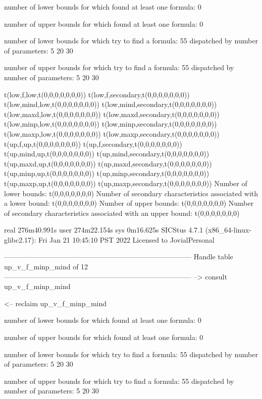 number of lower bounds for which found at least one formula: 0

number of upper bounds for which found at least one formula: 0

number of lower bounds for which try to find a formula: 55
dispatched by number of parameters: 5  20  30

number of upper bounds for which try to find a formula: 55
dispatched by number of parameters: 5  20  30

t(low,f,low,t(0,0,0,0,0,0,0))
t(low,f,secondary,t(0,0,0,0,0,0,0))
t(low,mind,low,t(0,0,0,0,0,0,0))
t(low,mind,secondary,t(0,0,0,0,0,0,0))
t(low,maxd,low,t(0,0,0,0,0,0,0))
t(low,maxd,secondary,t(0,0,0,0,0,0,0))
t(low,minp,low,t(0,0,0,0,0,0,0))
t(low,minp,secondary,t(0,0,0,0,0,0,0))
t(low,maxp,low,t(0,0,0,0,0,0,0))
t(low,maxp,secondary,t(0,0,0,0,0,0,0))
t(up,f,up,t(0,0,0,0,0,0,0))
t(up,f,secondary,t(0,0,0,0,0,0,0))
t(up,mind,up,t(0,0,0,0,0,0,0))
t(up,mind,secondary,t(0,0,0,0,0,0,0))
t(up,maxd,up,t(0,0,0,0,0,0,0))
t(up,maxd,secondary,t(0,0,0,0,0,0,0))
t(up,minp,up,t(0,0,0,0,0,0,0))
t(up,minp,secondary,t(0,0,0,0,0,0,0))
t(up,maxp,up,t(0,0,0,0,0,0,0))
t(up,maxp,secondary,t(0,0,0,0,0,0,0))
Number of lower bounds:                                             t(0,0,0,0,0,0,0)
Number of secondary characteristics associated with a lower bound:  t(0,0,0,0,0,0,0)
Number of upper bounds:                                             t(0,0,0,0,0,0,0)
Number of secondary characteristics associated with an upper bound: t(0,0,0,0,0,0,0)

real	276m40.991s
user	274m22.154s
sys	0m16.625s
SICStus 4.7.1 (x86_64-linux-glibc2.17): Fri Jan 21 10:45:10 PST 2022
Licensed to JovialPersonal


--------------------------------------------------------------------------------
Handle table up_v_f_minp_mind of 12
--------------------------------------------------------------------------------
--> consult up_v_f_minp_mind

<-- reclaim up_v_f_minp_mind

number of lower bounds for which found at least one formula: 0

number of upper bounds for which found at least one formula: 0

number of lower bounds for which try to find a formula: 55
dispatched by number of parameters: 5  20  30

number of upper bounds for which try to find a formula: 55
dispatched by number of parameters: 5  20  30

